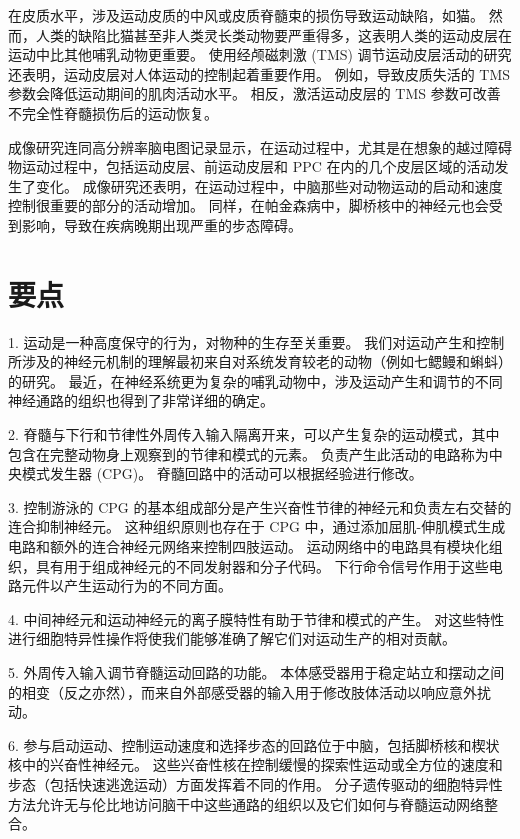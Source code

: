 在皮质水平，涉及运动皮质的中风或皮质脊髓束的损伤导致运动缺陷，如猫。 然而，人类的缺陷比猫甚至非人类灵长类动物要严重得多，这表明人类的运动皮层在运动中比其他哺乳动物更重要。 使用经颅磁刺激 (TMS) 调节运动皮层活动的研究还表明，运动皮层对人体运动的控制起着重要作用。 例如，导致皮质失活的 TMS 参数会降低运动期间的肌肉活动水平。 相反，激活运动皮层的 TMS 参数可改善不完全性脊髓损伤后的运动恢复。

成像研究连同高分辨率脑电图记录显示，在运动过程中，尤其是在想象的越过障碍物运动过程中，包括运动皮层、前运动皮层和 PPC 在内的几个皮层区域的活动发生了变化。 成像研究还表明，在运动过程中，中脑那些对动物运动的启动和速度控制很重要的部分的活动增加。 同样，在帕金森病中，脚桥核中的神经元也会受到影响，导致在疾病晚期出现严重的步态障碍。

\section{要点}


1. 运动是一种高度保守的行为，对物种的生存至关重要。 我们对运动产生和控制所涉及的神经元机制的理解最初来自对系统发育较老的动物（例如七鳃鳗和蝌蚪）的研究。 最近，在神经系统更为复杂的哺乳动物中，涉及运动产生和调节的不同神经通路的组织也得到了非常详细的确定。 

2. 脊髓与下行和节律性外周传入输入隔离开来，可以产生复杂的运动模式，其中包含在完整动物身上观察到的节律和模式的元素。 负责产生此活动的电路称为中央模式发生器 (CPG)。 脊髓回路中的活动可以根据经验进行修改。 

3. 控制游泳的 CPG 的基本组成部分是产生兴奋性节律的神经元和负责左右交替的连合抑制神经元。 这种组织原则也存在于 CPG 中，通过添加屈肌-伸肌模式生成电路和额外的连合神经元网络来控制四肢运动。 运动网络中的电路具有模块化组织，具有用于组成神经元的不同发射器和分子代码。 下行命令信号作用于这些电路元件以产生运动行为的不同方面。 

4. 中间神经元和运动神经元的离子膜特性有助于节律和模式的产生。 对这些特性进行细胞特异性操作将使我们能够准确了解它们对运动生产的相对贡献。 

5. 外周传入输入调节脊髓运动回路的功能。 本体感受器用于稳定站立和摆动之间的相变（反之亦然），而来自外部感受器的输入用于修改肢体活动以响应意外扰动。 

6. 参与启动运动、控制运动速度和选择步态的回路位于中脑，包括脚桥核和楔状核中的兴奋性神经元。 这些兴奋性核在控制缓慢的探索性运动或全方位的速度和步态（包括快速逃逸运动）方面发挥着不同的作用。 分子遗传驱动的细胞特异性方法允许无与伦比地访问脑干中这些通路的组织以及它们如何与脊髓运动网络整合。 

